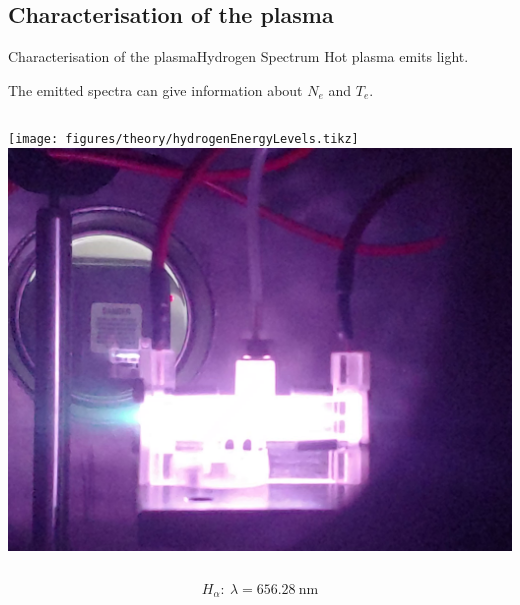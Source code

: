 \documentclass[dvipsnames]{beamer}
\begin{document}
\subsection{Characterisation of the plasma}
\begin{frame}{Characterisation of the plasma}{Hydrogen Spectrum}
Hot plasma emits light.

The emitted spectra can give information about $N_e$ and $T_e$.
\begin{columns}
 \texttt{[image: figures/theory/hydrogenEnergyLevels.tikz]}
 \includegraphics[width=\textwidth]{figures/theory/purple_plasma.png}
\end{columns}
$$H_{\alpha}:\ \lambda=\SI{656.28}{\nm}
$$
\end{frame}
% 
\end{document}
